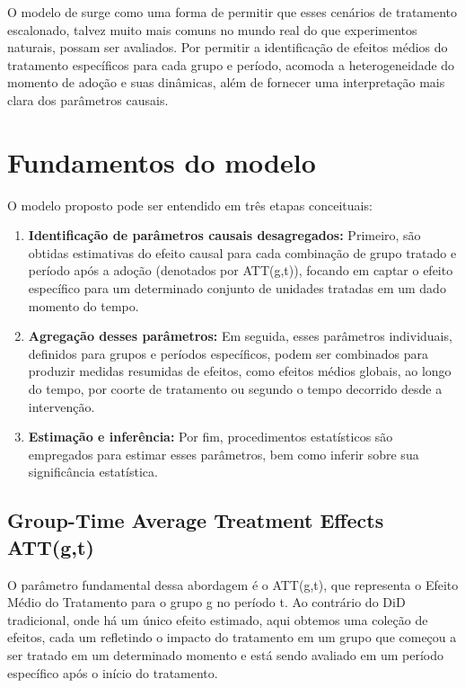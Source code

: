 \documentclass[
	12pt,				%
	openright,			%
	oneside,			%
	a4paper,			%
	english,			%
	french,				%
	spanish,			%
	brazil				%
	]{abntex2}
\begin{document}
O modelo de  surge como uma forma de permitir que esses cenários de tratamento escalonado, talvez muito mais comuns no mundo real do que experimentos naturais, possam ser avaliados. Por permitir a identificação de efeitos médios do tratamento específicos para cada grupo e período, acomoda a heterogeneidade do momento de adoção e suas dinâmicas, além de fornecer uma interpretação mais clara dos parâmetros causais.

\section{Fundamentos do modelo}

O modelo proposto pode ser entendido em três etapas conceituais:

\begin{enumerate}
\item \textbf{Identificação de parâmetros causais desagregados:} Primeiro, são obtidas estimativas do efeito causal para cada combinação de grupo tratado e período após a adoção (denotados por ATT(g,t)), focando em captar o efeito específico para um determinado conjunto de unidades tratadas em um dado momento do tempo.

\item \textbf{Agregação desses parâmetros:} Em seguida, esses parâmetros individuais, definidos para grupos e períodos específicos, podem ser combinados para produzir medidas resumidas de efeitos, como efeitos médios globais, ao longo do tempo, por coorte de tratamento ou segundo o tempo decorrido desde a intervenção.

\item \textbf{Estimação e inferência:} Por fim, procedimentos estatísticos são empregados para estimar esses parâmetros, bem como inferir sobre sua significância estatística.
\end{enumerate}

\subsection{Group-Time Average Treatment Effects ATT(g,t)}

O parâmetro fundamental dessa abordagem é o ATT(g,t), que representa o Efeito Médio do Tratamento para o grupo g no período t. Ao contrário do DiD tradicional, onde há um único efeito estimado, aqui obtemos uma coleção de efeitos, cada um refletindo o impacto do tratamento em um grupo que começou a ser tratado em um determinado momento e está sendo avaliado em um período específico após o início do tratamento.
\end{document}
